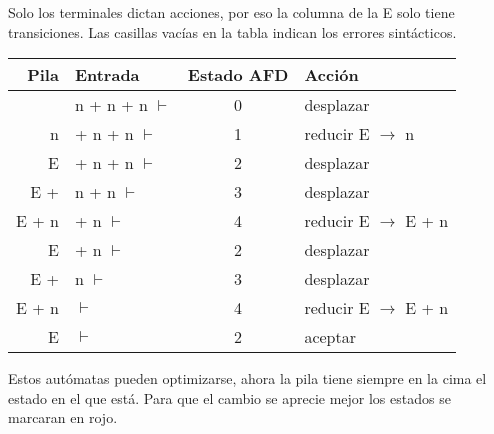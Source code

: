 \documentclass[\main/ApuntesPL.tex]{subfiles}
\begin{document}
    \par
    Solo los terminales dictan acciones, por eso la columna de la E solo tiene
    transiciones. Las casillas vacías en la tabla indican los errores
    sintácticos.

    \begin{center}
      \begin{tabular}{||r l c l||}
        \hline
        Pila & Entrada & Estado AFD & Acción \\ [0.5ex]
        \hline\hline
          & n + n + n $\vdash$ & 0 & desplazar \\
        \hline
        n & + n + n $\vdash$ & 1 & reducir E $\rightarrow$ n \\
        \hline
        E & + n + n $\vdash$ & 2 & desplazar \\
        \hline
        E + & n + n $\vdash$ & 3 & desplazar \\
        \hline
        E + n & + n $\vdash$ & 4 & reducir E $\rightarrow$ E + n \\
        \hline
        E & + n $\vdash$ & 2 & desplazar \\
        \hline
        E + & n $\vdash$ & 3 & desplazar \\
        \hline
        E + n & $\vdash$ & 4 & reducir E $\rightarrow$ E + n \\
        \hline
        E & $\vdash$ & 2 & aceptar \\ [1ex]
        \hline
      \end{tabular}
    \end{center}

    \bigskip
    \par
    Estos autómatas pueden optimizarse, ahora la pila tiene siempre en la cima
    el estado en el que está. Para que el cambio se aprecie mejor los
    estados se marcaran en {\color{red}rojo}.
\end{document}
